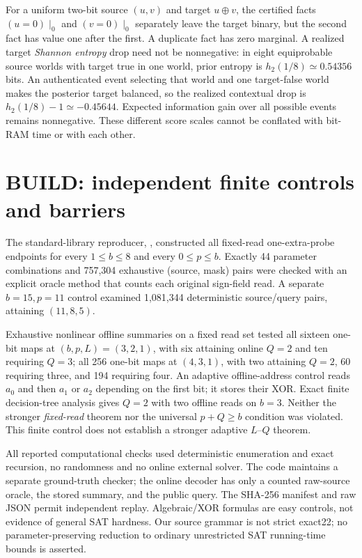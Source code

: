 \documentclass[10pt]{article}
\begin{document}
For a uniform two-bit source $(u,v)$ and target $u\oplus v$, the certified facts $(u=0)\mid_{0}$ and $(v=0)\mid_{0}$ separately leave the target binary, but the second fact has value one after the first. A duplicate fact has zero marginal. A realized target \emph{Shannon entropy} drop need not be nonnegative: in eight equiprobable source worlds with target true in one world, prior entropy is $h_2(1/8)\simeq0.54356$ bits. An authenticated event selecting that world and one target-false world makes the posterior target balanced, so the realized contextual drop is $h_2(1/8)-1\simeq-0.45644$. Expected information gain over all possible events remains nonnegative. These different score scales cannot be conflated with bit-RAM time or with each other.

\section{BUILD: independent finite controls and barriers}
The standard-library reproducer, , constructed all fixed-read one-extra-probe endpoints for every $1\le b\le8$ and every $0\le p\le b$. Exactly 44 parameter combinations and 757,304 exhaustive (source, mask) pairs were checked with an explicit oracle method that counts each original sign-field read. A separate $b=15,p=11$ control examined 1,081,344 deterministic source/query pairs, attaining $(11,8,5)$.

Exhaustive nonlinear offline summaries on a fixed read set tested all sixteen one-bit maps at $(b,p,L)=(3,2,1)$, with six attaining online $Q=2$ and ten requiring $Q=3$; all 256 one-bit maps at $(4,3,1)$, with two attaining $Q=2$, 60 requiring three, and 194 requiring four. An adaptive offline-address control reads $a_0$ and then $a_1$ or $a_2$ depending on the first bit; it stores their XOR. Exact finite decision-tree analysis gives $Q=2$ with two offline reads on $b=3$. Neither the stronger \emph{fixed-read} theorem nor the universal $p+Q\ge b$ condition was violated. This finite control does not establish a stronger adaptive $L$--$Q$ theorem.

All reported computational checks used deterministic enumeration and exact recursion, no randomness and no online external solver. The code maintains a separate ground-truth checker; the online decoder has only a counted raw-source oracle, the stored summary, and the public query. The SHA-256 manifest and raw JSON permit independent replay. Algebraic/XOR formulas are easy controls, not evidence of general SAT hardness. Our source grammar is not strict exact22; no parameter-preserving reduction to ordinary unrestricted SAT running-time bounds is asserted.
\end{document}
